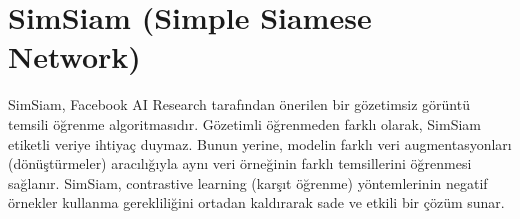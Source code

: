 \section{SimSiam (Simple Siamese Network)}

SimSiam, Facebook AI Research tarafından önerilen bir gözetimsiz görüntü temsili öğrenme algoritmasıdır. Gözetimli öğrenmeden farklı olarak, SimSiam etiketli veriye ihtiyaç duymaz. Bunun yerine, modelin farklı veri augmentasyonları (dönüştürmeler) aracılığıyla aynı veri örneğinin farklı temsillerini öğrenmesi sağlanır. SimSiam, contrastive learning (karşıt öğrenme) yöntemlerinin negatif örnekler kullanma gerekliliğini ortadan kaldırarak sade ve etkili bir çözüm sunar.

\newpage